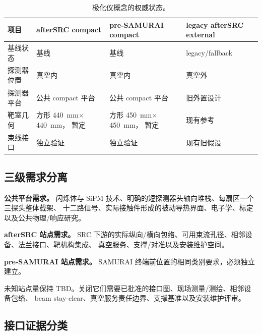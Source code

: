 \documentclass[UTF8,10pt,letterpaper,fontset=none]{ctexart}
\begin{document}
\begin{table}[htbp]
  \centering
  \small
  \caption{极化仪概念的权威状态。}
  \begin{tabularx}{\textwidth}{L{0.22\textwidth}Y Y Y}
    \toprule
    项目 & afterSRC compact & pre-SAMURAI compact & legacy afterSRC external \\
    \midrule
    基线状态 & 基线 & 基线 & legacy/fallback \\
    探测器位置 & 真空内 & 真空内 & 真空外 \\
    探测器平台 & 公共 compact 平台 & 公共 compact 平台 & 旧外置设计 \\
    靶室几何 & 方形 \SI{440}{\milli\meter}$\times$\SI{440}{\milli\meter}，
      暂定 & 方形 \SI{450}{\milli\meter}$\times$\SI{450}{\milli\meter}，
      暂定 & 现有参考 \\
    束线接口 & 独立验证 & 独立验证 & 现有旧假设 \\
    \bottomrule
  \end{tabularx}
\end{table}

\subsection{三级需求分离}

\textbf{公共平台需求。}
闪烁体与 SiPM 技术、明确的短探测器头轴向堆栈、每扇区一个三探头整体载架、
十二路信号、实际接触件形成的被动导热界面、电子学、标定以及公共物理/响应研究。

\textbf{afterSRC 站点需求。}
SRC 下游的实际纵向/横向包络、可用束流孔径、相邻设备、法兰接口、靶机构集成、
真空服务、支撑/对准以及安装维护空间。

\textbf{pre-SAMURAI 站点需求。}
SAMURAI 终端前位置的相同类别要求，必须独立建立。

未知站点量保持 TBD。关闭它们需要已批准的接口图、现场测量/测绘、相邻设备包络、
beam stay-clear、真空服务责任边界、支撑基准以及安装维护评审。

\subsection{接口证据分类}
\end{document}
